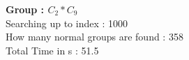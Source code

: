 \textbf{Group : $C_2*C_9$}\\
Searching up to index : 1000\\
How many normal groups are found : 358\\
Total Time in s : 51.5\\
